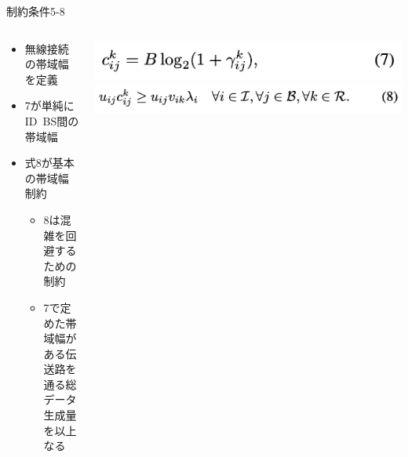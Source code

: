 \documentclass[unicode,12pt,aspectratio=169, dvipdfmx]{beamer}
\begin{document}
    \begin{frame}{制約条件5-8}
        \begin{columns}
            \begin{column}[T]{.5\linewidth}
                \begin{itemize}
                    \item 無線接続の帯域幅を定義
                    \item 7が単純にID~BS間の帯域幅
                    \item 式8が基本の帯域幅制約
                    \begin{itemize}
                        \item 8は混雑を回避するための制約
                        \item 7で定めた帯域幅がある伝送路を通る総データ生成量を以上なる
                    \end{itemize}    
                \end{itemize}          
            \end{column}
            \begin{column}[T]{.5\linewidth}
                \begin{center}
                    \includegraphics[scale=0.4]{figures/eq7.png}
                    \includegraphics[scale=0.4]{figures/eq8.png}
                \end{center}
        \end{column}
        \end{columns}
    \end{frame}
\end{document}
